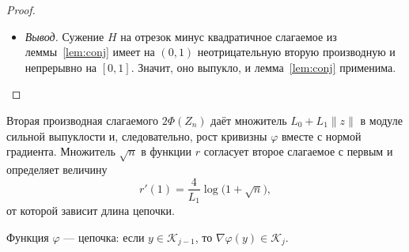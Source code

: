 \documentclass[11pt,a4paper]{article}
\newcommand{\norm}[1]{\|#1\|}
\newcommand{\by}[2]{\mathrel{\underset{#2}{#1}}}
\newcommand{\bypad}[3]{\mathrel{\underset{\mathmakebox[\widthof{$\scriptstyle#3$}]{#2}}{#1}}}
\begin{document}
\begin{proof}
\begin{itemize}
\begin{align*}
 \frac{r''(p_i)}{W_n}
 &\by{=}{\eqref{eq:r-derivatives}}\frac{4\sqrt n}{L_1W_n\,(1+\sqrt n\,p_i)}
 \by{\ge}{\eqref{eq:simplex-p}}\frac2{L_1W_n\norm p}\\
 &\bypad{=}{}{\eqref{eq:r-derivatives}}\frac2{L_1\norm w}
 \ge\frac2{L_0+L_1\norm w},\\
 \frac2{L_0+L_1W_n}
 &\by{\ge}{\norm p\le1}\frac{2\norm p^2}{L_0+L_1W_n\norm p}
 =\frac{2\norm p^2}{L_0+L_1\norm w} .
\end{align*}
Подставляя их в~\eqref{eq:H-second}, получаем
\begin{align*}
 \frac{d^2}{dt^2}H(w)
 &\ge\frac2{L_0+L_1\norm w}\Bigl(\norm p^2U_n^2+\norm{u-pU_n}^2\Bigr)\\
 &\by{\ge}{(\mathrm a)}\frac{\norm u^2}{L_0+L_1\norm w}
 \by{\ge}{(\mathrm б)}\frac{\norm u^2}{L_0+L_1\max\{\norm z,\norm{z'}\}} .
\end{align*}
Здесь (а) --- неравенство $\norm{u}^2\le2\norm{pU_n}^2+2\norm{u-pU_n}^2$, (б) --- выпуклость нормы.
\item \emph{Вывод.} Сужение $H$ на отрезок минус квадратичное слагаемое из леммы~\ref{lem:conj} имеет на $(0,1)$ неотрицательную вторую производную и непрерывно на $[0,1]$. Значит, оно выпукло, и лемма~\ref{lem:conj} применима.\qedhere
\end{itemize}
\end{proof}

Вторая производная слагаемого $2\Phi(Z_n)$ даёт множитель $L_0+L_1\norm z$ в модуле сильной выпуклости и, следовательно, рост кривизны $\varphi$ вместе с нормой градиента. Множитель $\sqrt n$ в функции $r$ согласует второе слагаемое с первым и определяет величину
\[
 r'(1)=\frac4{L_1}\log\bigl(1+\sqrt n\bigr),
\]
от которой зависит длина цепочки.

\begin{lemma}[цепочка]\label{lem:ord-local}
Функция $\varphi$ --- цепочка: если $y\in\mathcal K_{j-1}$, то $\nabla\varphi(y)\in\mathcal K_j$.
\end{lemma}
\end{document}
